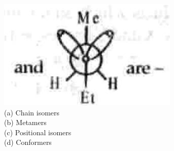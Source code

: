 \documentclass[10pt]{article}
\begin{document}
\includegraphics[max width=\textwidth, center]{2025_01_28_8470952b98110cec3aabg-142}\\
(a) Chain isomers\\
(b) Metamers\\
(c) Positional isomers\\
(d) Conformers
\end{document}
